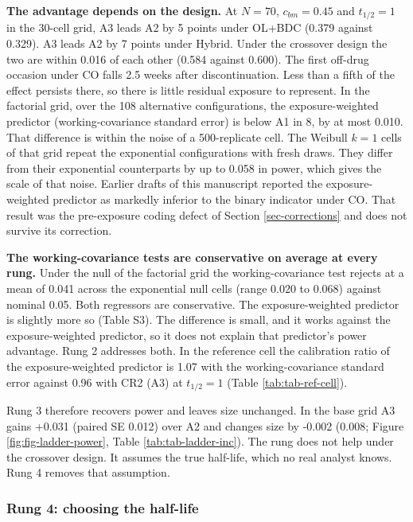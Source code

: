 \documentclass[
  11pt,
]{article}
\begin{document}
\textbf{The advantage depends on the design.} At \(N = 70\),
\(c_{bm} = 0.45\) and \(t_{1/2} = 1\) in the 30-cell grid, A3 leads A2 by
5
points under OL+BDC (0.379
against 0.329). A3 leads A2 by
7
points under Hybrid. Under the crossover design the two are within
0.016
of each other
(0.584 against
0.600). The first
off-drug occasion under CO falls 2.5 weeks after discontinuation.
Less than a fifth of the effect persists there, so there is little
residual exposure to represent. In the factorial grid,
over the 108 alternative configurations, the
exposure-weighted predictor (working-covariance standard error) is
below A1 in 8, by at most
0.010. That difference is within the noise
of a 500-replicate cell. The Weibull \(k = 1\) cells of that grid repeat
the exponential configurations with fresh draws. They differ from their
exponential counterparts by up to 0.058 in
power, which gives the scale of that noise. Earlier drafts of this
manuscript reported the exposure-weighted predictor as markedly
inferior to the binary indicator under CO. That result was the
pre-exposure coding defect of Section
\ref{sec-corrections} and does not survive its correction.

\textbf{The working-covariance tests are conservative on average at every
rung.} Under the null of the factorial grid the working-covariance
test rejects at a mean of
0.041 across the exponential null cells
(range 0.020 to
0.068) against nominal 0.05. Both
regressors are conservative. The exposure-weighted predictor is
slightly more so (Table S3). The difference is small, and it works
against the exposure-weighted predictor, so it does not explain that
predictor's power advantage. Rung 2 addresses both. In the reference
cell the calibration ratio of the exposure-weighted predictor is
1.07 with the
working-covariance standard error against
0.96 with CR2 (A3) at
\(t_{1/2} = 1\) (Table \ref{tab:tab-ref-cell}).

Rung 3 therefore recovers power and leaves size unchanged. In the
base grid A3 gains
+0.031 (paired SE 0.012)
over A2 and changes size by -0.002
(0.008; Figure
\ref{fig:fig-ladder-power}, Table \ref{tab:tab-ladder-inc}). The
rung does not help under the crossover design. It assumes the true
half-life, which no real analyst knows. Rung 4 removes that
assumption.

\subsubsection{Rung 4: choosing the half-life}\label{sec-rung4}
\end{document}
